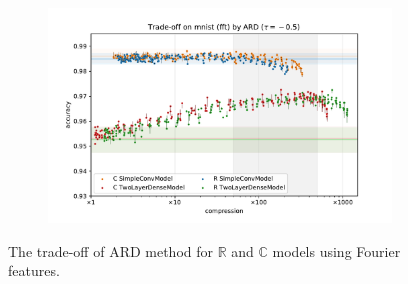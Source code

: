 \documentclass[a4paper,10pt]{article}
\newcommand{\real}{\mathbb{R}}
\newcommand{\cplx}{\mathbb{C}}
\begin{document}
\begin{figure}[b]
\begin{subfigure}[b]{0.5\textwidth}
  \end{subfigure}%
  \begin{subfigure}[b]{0.5\textwidth}
    \centering
    \includegraphics[width=\linewidth]{figure__mnist-like__trade-off/appendix__ARD__mnist__fft__-0.5.pdf}
  \end{subfigure}
  \caption{%
    The trade-off of ARD method for $\real$ and $\cplx$ models using Fourier features.
  }
  \label{fig:appendix__mnist-like__trade-off__ARD__fft}
\end{figure}
\end{document}
